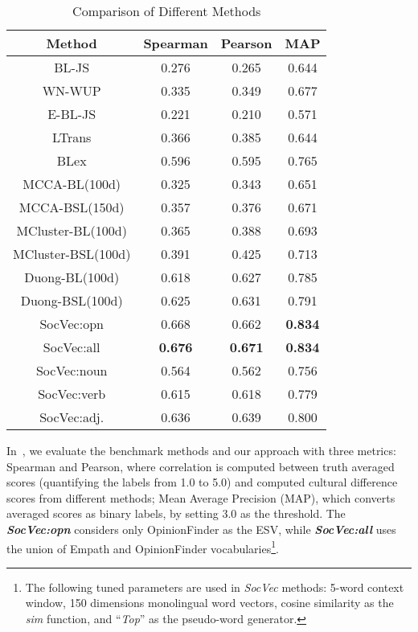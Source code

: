 \begin{table}[t]
	\small
	\centering
	\caption{{Comparison of Different Methods}}
	\begin{tabular}{c|c|c|c}
		
		\textbf{Method} & \textbf{Spearman} & \textbf{Pearson}  & \textbf{MAP} \\ \hline
		BL-JS& 0.276 & 0.265 & 0.644   \\ 
		WN-WUP  & 0.335 & 0.349 & 0.677 \\ 
		E-BL-JS & 0.221 & 0.210  & 0.571\\ 
		LTrans& 0.366 & 0.385  & 0.644  \\
		BLex & 0.596 & 0.595  & 0.765 \\ \hline 
		
MCCA-BL(100d)&0.325&0.343&0.651\\  
MCCA-BSL(150d)&0.357&0.376&0.671\\ 
MCluster-BL(100d)&0.365&0.388&0.693\\ 
MCluster-BSL(100d)&0.391&0.425&0.713\\ 
Duong-BL(100d)&0.618&0.627&0.785\\ 
Duong-BSL(100d)&0.625&0.631&0.791 \\ \hline 
		SocVec:opn& 0.668 & 0.662   & \textbf{0.834} \\ 
		SocVec:all& \textbf{0.676} & \textbf{0.671}  & \textbf{0.834}\\ 
		SocVec:noun & 0.564 & 0.562 & 0.756 \\ 
		SocVec:verb & 0.615 & 0.618 & 0.779 \\ 
		SocVec:adj. & 0.636 & 0.639 & 0.800 \\ \hline
	\end{tabular}
	\label{tab:mcdne_res_1}
\end{table}


In~, we evaluate the benchmark methods and our approach with three metrics: Spearman and 
Pearson, where correlation is computed between truth averaged scores (quantifying the labels from 1.0 to 5.0) and computed cultural difference scores from different methods; Mean Average Precision (MAP), which converts averaged scores as binary labels, by setting 3.0 as the threshold. 
The \textbf{\textit{SocVec:opn}} considers only OpinionFinder as the ESV, while \textbf{\textit{SocVec:all}} uses the union of Empath and OpinionFinder vocabularies\footnote{The following tuned parameters are used in \textit{SocVec} methods: 5-word context window, 150 dimensions monolingual word vectors, cosine similarity as the \textit{sim} function,  and ``\textit{Top}'' as the pseudo-word generator.
}. 

